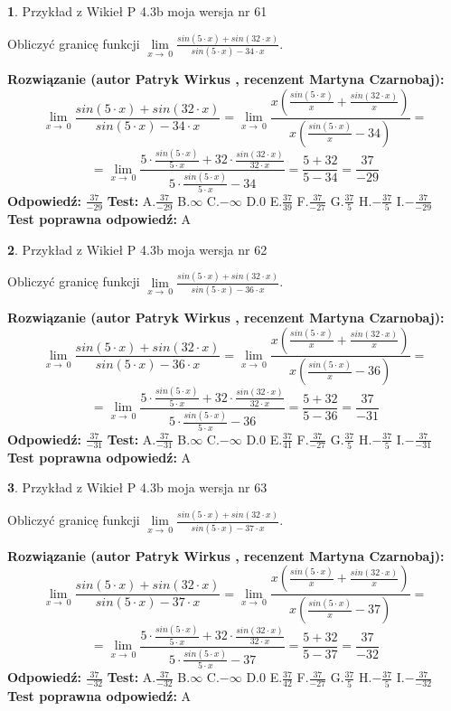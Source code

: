\documentclass[12pt, a4paper]{article}
\theoremstyle{definition} %
\newtheorem{zad}{}
\newcommand{\zadStart}[1]{\begin{zad}#1\newline}
\newcommand{\zadStop}{\end{zad}}
\newcommand{\rozwStart}[2]{\noindent \textbf{Rozwiązanie (autor #1 , recenzent #2): }\newline}
\newcommand{\rozwStop}{\newline}
\newcommand{\odpStart}{\noindent \textbf{Odpowiedź:}\newline}
\newcommand{\odpStop}{\newline}
\newcommand{\testStart}{\noindent \textbf{Test:}\newline}
\newcommand{\testStop}{\newline}
\newcommand{\kluczStart}{\noindent \textbf{Test poprawna odpowiedź:}\newline}
\newcommand{\kluczStop}{\newline}
\begin{document}
\zadStart{Przykład z Wikieł P 4.3b moja wersja nr 61}


Obliczyć granicę funkcji $\lim\limits_{x\to\ 0}\frac{sin(5 \cdot x)+sin(32 \cdot x)}{sin(5 \cdot x)-34 \cdot x}$.
\zadStop
\rozwStart{Patryk Wirkus}{Martyna Czarnobaj}
$$\lim\limits_{x\to\ 0}\frac{sin(5 \cdot x)+sin(32 \cdot x)}{sin(5 \cdot x)-34 \cdot x}=\lim\limits_{x\to\ 0}\frac{x(\frac{sin(5 \cdot x)}{x}+\frac{sin(32 \cdot x)}{x})}{x(\frac{sin(5 \cdot x)}{x}-34)}=$$
$$=\lim\limits_{x\to\ 0}\frac{5 \cdot \frac{sin(5 \cdot x)}{5 \cdot x}+32 \cdot \frac{sin(32 \cdot x)}{32 \cdot x}}{5 \cdot \frac{sin(5 \cdot x)}{5 \cdot x}-34}=\frac{5+32}{5-34} = \frac{37}{-29}$$
\rozwStop
\odpStart
$\frac{37}{-29}$
\odpStop
\testStart
A.$\frac{37}{-29}$
B.$\infty$
C.$-\infty$
D.$0$
E.$\frac{37}{39}$
F.$\frac{37}{-27}$
G.$\frac{37}{5}$
H.$-\frac{37}{5}$
I.$-\frac{37}{-29}$
\testStop
\kluczStart
A
\kluczStop



\zadStart{Przykład z Wikieł P 4.3b moja wersja nr 62}


Obliczyć granicę funkcji $\lim\limits_{x\to\ 0}\frac{sin(5 \cdot x)+sin(32 \cdot x)}{sin(5 \cdot x)-36 \cdot x}$.
\zadStop
\rozwStart{Patryk Wirkus}{Martyna Czarnobaj}
$$\lim\limits_{x\to\ 0}\frac{sin(5 \cdot x)+sin(32 \cdot x)}{sin(5 \cdot x)-36 \cdot x}=\lim\limits_{x\to\ 0}\frac{x(\frac{sin(5 \cdot x)}{x}+\frac{sin(32 \cdot x)}{x})}{x(\frac{sin(5 \cdot x)}{x}-36)}=$$
$$=\lim\limits_{x\to\ 0}\frac{5 \cdot \frac{sin(5 \cdot x)}{5 \cdot x}+32 \cdot \frac{sin(32 \cdot x)}{32 \cdot x}}{5 \cdot \frac{sin(5 \cdot x)}{5 \cdot x}-36}=\frac{5+32}{5-36} = \frac{37}{-31}$$
\rozwStop
\odpStart
$\frac{37}{-31}$
\odpStop
\testStart
A.$\frac{37}{-31}$
B.$\infty$
C.$-\infty$
D.$0$
E.$\frac{37}{41}$
F.$\frac{37}{-27}$
G.$\frac{37}{5}$
H.$-\frac{37}{5}$
I.$-\frac{37}{-31}$
\testStop
\kluczStart
A
\kluczStop



\zadStart{Przykład z Wikieł P 4.3b moja wersja nr 63}


Obliczyć granicę funkcji $\lim\limits_{x\to\ 0}\frac{sin(5 \cdot x)+sin(32 \cdot x)}{sin(5 \cdot x)-37 \cdot x}$.
\zadStop
\rozwStart{Patryk Wirkus}{Martyna Czarnobaj}
$$\lim\limits_{x\to\ 0}\frac{sin(5 \cdot x)+sin(32 \cdot x)}{sin(5 \cdot x)-37 \cdot x}=\lim\limits_{x\to\ 0}\frac{x(\frac{sin(5 \cdot x)}{x}+\frac{sin(32 \cdot x)}{x})}{x(\frac{sin(5 \cdot x)}{x}-37)}=$$
$$=\lim\limits_{x\to\ 0}\frac{5 \cdot \frac{sin(5 \cdot x)}{5 \cdot x}+32 \cdot \frac{sin(32 \cdot x)}{32 \cdot x}}{5 \cdot \frac{sin(5 \cdot x)}{5 \cdot x}-37}=\frac{5+32}{5-37} = \frac{37}{-32}$$
\rozwStop
\odpStart
$\frac{37}{-32}$
\odpStop
\testStart
A.$\frac{37}{-32}$
B.$\infty$
C.$-\infty$
D.$0$
E.$\frac{37}{42}$
F.$\frac{37}{-27}$
G.$\frac{37}{5}$
H.$-\frac{37}{5}$
I.$-\frac{37}{-32}$
\testStop
\kluczStart
A
\kluczStop
\end{document}
